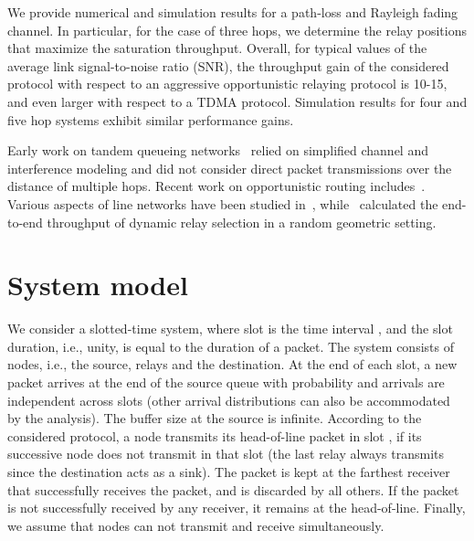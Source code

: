 \documentclass[draftclsnofoot,10pt,onecolumn,letterpaper]{IEEEtran}
\begin{document}
We provide numerical and simulation results for a path-loss and Rayleigh fading channel. In particular, for the case of three hops, 
we determine the relay positions that maximize the saturation throughput. Overall, for typical values of the average link signal-to-noise ratio (SNR), the throughput gain of the considered protocol with respect to an aggressive opportunistic relaying protocol is 10-15, and even larger with respect to a TDMA protocol. Simulation results for four and five hop systems exhibit similar performance gains. 

Early work on tandem queueing networks~\cite{Sidi87} relied on simplified channel and interference modeling and 
did not consider direct packet transmissions over the distance of multiple hops. Recent work on  
opportunistic routing includes~\cite{Zorzi03,Biswas05,chiarotto10}. Various aspects of line networks have been studied 
in~\cite{Appuswamy10,Vellambi11,Ikki2012}, while~\cite{Chen2012} calculated the end-to-end throughput of dynamic relay selection in a random geometric setting.


\section{System model}
\label{Sec:sysMod}

We consider a slotted-time system, where slot  is the time interval , and the slot duration, i.e., unity, is equal to the duration of a packet.
The system consists of  nodes, i.e., the source,  relays and the destination. 
At the end of each slot, a new packet arrives at the end of the source queue with probability  and arrivals are independent across slots (other arrival distributions can also be accommodated by the analysis). The buffer size at the source is infinite. According to the considered protocol, a node transmits its head-of-line packet in slot , if 
its successive node does not transmit in that slot (the last relay always transmits since the destination acts as a sink). 
The packet is kept at the farthest receiver that successfully receives the packet, and is discarded by all others.
If the packet is not successfully received by any receiver, it remains at the head-of-line. 
Finally, we assume that nodes can not transmit and receive simultaneously.
 
\end{document}
